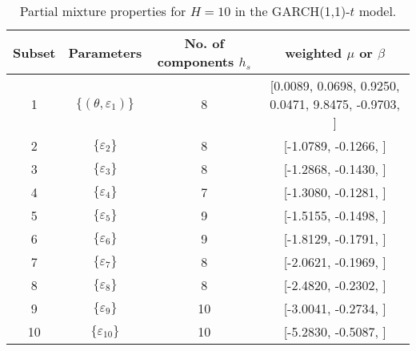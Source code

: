 \begin{table}[h] 
\centering 
\caption{Partial mixture properties for $H=10$ in the GARCH(1,1)-$t$ model.} 
\label{tab:pmits_t_garch2_noS} 
\begin{tabular}{cccc}  
 Subset & Parameters& No. of components $h_{s}$ & weighted $\mu$ or $\beta$  \\ \hline 
1 & $\{(\theta,\varepsilon_{1})\}$ & 8 & [0.0089, 0.0698, 0.9250, 0.0471, 9.8475, -0.9703, ]   \\ [1ex] 
2 & $\{\varepsilon_{2}\}$ & 8 & [-1.0789, -0.1266, ]   \\ [1ex] 
3 & $\{\varepsilon_{3}\}$ & 8 & [-1.2868, -0.1430, ]   \\ [1ex] 
4 & $\{\varepsilon_{4}\}$ & 7 & [-1.3080, -0.1281, ]   \\ [1ex] 
5 & $\{\varepsilon_{5}\}$ & 9 & [-1.5155, -0.1498, ]   \\ [1ex] 
6 & $\{\varepsilon_{6}\}$ & 9 & [-1.8129, -0.1791, ]   \\ [1ex] 
7 & $\{\varepsilon_{7}\}$ & 8 & [-2.0621, -0.1969, ]   \\ [1ex] 
8 & $\{\varepsilon_{8}\}$ & 8 & [-2.4820, -0.2302, ]   \\ [1ex] 
9 & $\{\varepsilon_{9}\}$ & 10 & [-3.0041, -0.2734, ]   \\ [1ex] 
10 & $\{\varepsilon_{10}\}$ & 10 & [-5.2830, -0.5087, ]   \\ [1ex] 
\hline 
\end{tabular} 
\end{table} 
